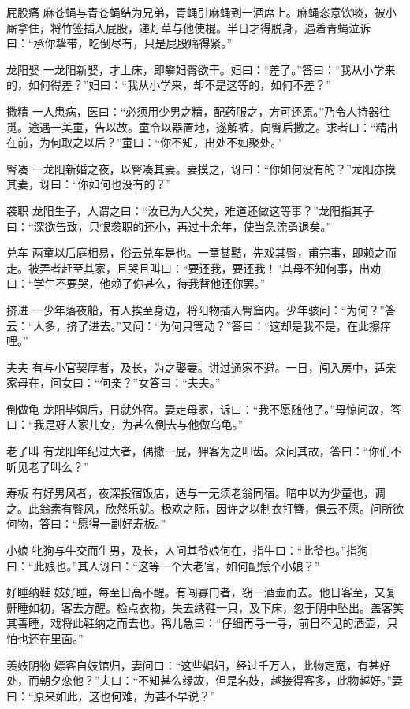 \documentclass[12pt,UTF8]{ctexbook}
\begin{document}
屁股痛
麻苍蝇与青苍蝇结为兄弟，青蝇引麻蝇到一酒席上。麻蝇恣意饮啖，被小厮拿住，将竹签插入屁股，递灯草与他使棍。半日才得脱身，遇着青蝇泣诉曰：“承你挚带，吃倒尽有，只是屁股痛得紧。”

龙阳娶
一龙阳新娶，才上床，即攀妇臀欲干。妇曰：“差了。”答曰：“我从小学来的，如何得差？”妇曰：“我从小学来，却不是这等的，如何不差？”

撒精
一人患病，医曰：“必须用少男之精，配药服之，方可还原。”乃令人持器往觅。途遇一美童，告以故。童令以器置地，遂解裤，向臀后撒之。求者曰：“精出在前，为何取之以后？”童曰：“你不知，出处不如聚处。”

臀凑
一龙阳新婚之夜，以臀凑其妻。妻摸之，讶曰：“你如何没有的？”龙阳亦摸其妻，讶曰：“你如何也没有的？”

袭职
龙阳生子，人谓之曰：“汝已为人父矣，难道还做这等事？”龙阳指其子曰：“深欲告致，只恨袭职的还小，再过十余年，使当急流勇退矣。”

兑车
两童以后庭相易，俗云兑车是也。一童甚黠，先戏其臀，甫完事，即赖之而走。被弄者赶至其家，且哭且叫曰：“要还我，要还我！”其母不知何事，出劝曰：“学生不要哭，他赖了你甚么，待我替他还你罢。”

挤进
一少年落夜船，有人挨至身边，将阳物插入臀窟内。少年骇问：“为何？”答云：“人多，挤了进去。”又问：“为何只管动？”答曰：“这却是我不是，在此擦痒哩。”

夫夫
有与小官契厚者，及长，为之娶妻。讲过通家不避。一日，闯入房中，适亲家母在，问女曰：“何亲？”女答曰：“夫夫。”

倒做龟
龙阳毕姻后，日就外宿。妻走母家，诉曰：“我不愿随他了。”母惊问故，答曰：“我是好人家儿女，为甚么倒去与他做乌龟。”

老了叫
有龙阳年纪过大者，偶撒一屁，狎客为之叩齿。众问其故，答曰：“你们不听见老了叫么？”

寿板
有好男风者，夜深投宿饭店，适与一无须老翁同宿。暗中以为少童也，调之。此翁素有臀风，欣然乐就。极欢之际，因许之以制衣打簪，俱云不愿。问所欲何物，答曰：“愿得一副好寿板。”

小娘
牝狗与牛交而生男，及长，人问其爷娘何在，指牛曰：“此爷也。”指狗曰：“此娘也。”其人讶曰：“这等一个大老官，如何配恁个小娘？”

好睡纳鞋
妓好睡，每至日高不醒。有闯寡门者，窃一酒壶而去。他日客至，又复鼾睡如初，客去方醒。检点衣物，失去绣鞋一只，及下床，忽于阴中坠出。盖客笑其善睡，戏将此鞋纳之而去也。鸨儿急曰：“仔细再寻一寻，前日不见的酒壶，只怕也还在里面。”

羡妓阴物
嫖客自妓馆归，妻问曰：“这些娼妇，经过千万人，此物定宽，有甚好处，而朝夕恋他？”夫曰：“不知甚么缘故，但是名妓，越接得客多，此物越好。”妻曰：“原来如此，这也何难，为甚不早说？”
\end{document}
